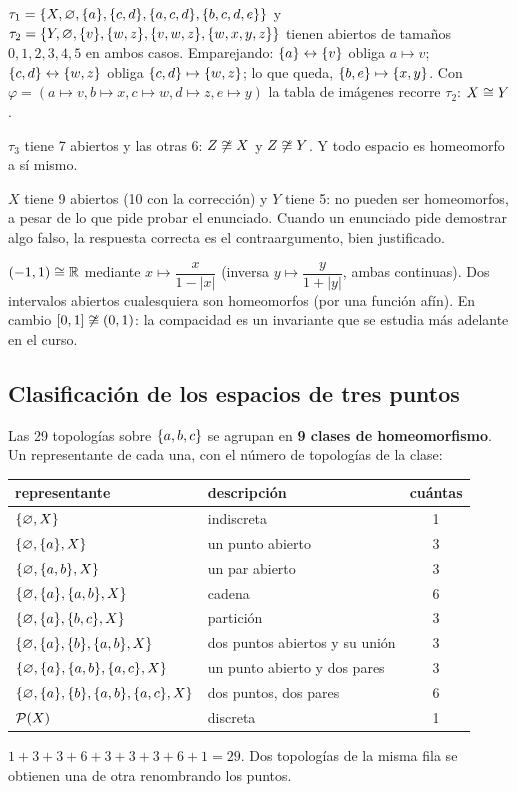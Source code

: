 \begin{ejemplo}
$\tau_1=\{X,\varnothing,\{a\},\{c,d\},\{a,c,d\},\{b,c,d,e\}\}$ y $\tau_2=\{Y,\varnothing,\{v\},\{w,z\},\{v,w,z\},\{w,x,y,z\}\}$ tienen
abiertos de tamaños $0,1,2,3,4,5$ en ambos casos. Emparejando: $\{a\}\leftrightarrow\{v\}$ obliga $a\mapsto v$;
$\{c,d\}\leftrightarrow\{w,z\}$ obliga $\{c,d\}\mapsto\{w,z\}$; lo que queda, $\{b,e\}\mapsto\{x,y\}$.
Con $\varphi=(a\mapsto v,b\mapsto x,c\mapsto w,d\mapsto z,e\mapsto y)$ la tabla de imágenes recorre $\tau_2$:
$X\cong Y$.

$\tau_3$ tiene 7 abiertos y las otras 6: $Z\not\cong X$ y $Z\not\cong Y$. Y todo espacio es homeomorfo a sí mismo.
\end{ejemplo}
\begin{ejemplo}
$X$ tiene 9 abiertos (10 con la corrección) y $Y$ tiene 5: no pueden ser homeomorfos, a pesar de lo que pide probar
el enunciado. Cuando un enunciado pide demostrar algo falso, la respuesta correcta es el contraargumento, bien
justificado.
\end{ejemplo}
\begin{ejemplo}[Ejemplos en $\R$]
$(-1,1)\cong\mathbb{R}$ mediante $x\mapsto\dfrac{x}{1-|x|}$ (inversa $y\mapsto\dfrac{y}{1+|y|}$, ambas continuas). Dos
intervalos abiertos cualesquiera son homeomorfos (por una función afín). En cambio $[0,1]\not\cong(0,1)$: la
compacidad es un invariante que se estudia más adelante en el curso.
\end{ejemplo}

\subsection{Clasificación de los espacios de tres puntos}
Las 29 topologías sobre $\{a,b,c\}$ se agrupan en \textbf{9 clases de homeomorfismo}. Un representante de
cada una, con el número de topologías de la clase:
\begin{center}\small\renewcommand{\arraystretch}{1.2}
\begin{tabular}{@{}llc@{}}\toprule
representante & descripción & cuántas\\ \midrule
$\{\varnothing,X\}$ & indiscreta & 1\\
$\{\varnothing,\{a\},X\}$ & un punto abierto & 3\\
$\{\varnothing,\{a,b\},X\}$ & un par abierto & 3\\
$\{\varnothing,\{a\},\{a,b\},X\}$ & cadena & 6\\
$\{\varnothing,\{a\},\{b,c\},X\}$ & partición & 3\\
$\{\varnothing,\{a\},\{b\},\{a,b\},X\}$ & dos puntos abiertos y su unión & 3\\
$\{\varnothing,\{a\},\{a,b\},\{a,c\},X\}$ & un punto abierto y dos pares & 3\\
$\{\varnothing,\{a\},\{b\},\{a,b\},\{a,c\},X\}$ & dos puntos, dos pares & 6\\
$\mathcal{P}(X)$ & discreta & 1\\ \bottomrule
\end{tabular}\end{center}
$1+3+3+6+3+3+3+6+1=29$. Dos topologías de la misma fila se obtienen una de otra renombrando los puntos.

